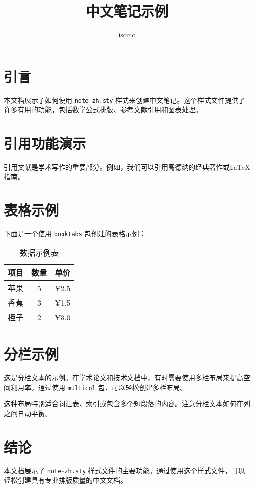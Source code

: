 \documentclass{article}
\title{中文笔记示例}
\author{isomo}
\begin{document}
\maketitle

\section{引言}
本文档展示了如何使用 \texttt{note-zh.sty} 样式来创建中文笔记。这个样式文件提供了许多有用的功能，包括数学公式排版、参考文献引用和图表处理。

\section{引用功能演示}
引用文献是学术写作的重要部分。例如，我们可以引用高德纳的经典著作\cite{knuth1984texbook}或LaTeX指南\cite{lamport1994latex}。

\section{表格示例}
下面是一个使用 \texttt{booktabs} 包创建的表格示例：

\begin{table}[htbp]
  \centering
  \caption{数据示例表}
  \begin{tabular}{lcc}
    \toprule
    项目 & 数量 & 单价 \\
    \midrule
    苹果 & 5 & ¥2.5 \\
    香蕉 & 3 & ¥1.5 \\
    橙子 & 2 & ¥3.0 \\
    \bottomrule
  \end{tabular}
\end{table}

\section{分栏示例}
\begin{multicols}{2}
  这是分栏文本的示例。在学术论文和技术文档中，有时需要使用多栏布局来提高空间利用率。通过使用 \texttt{multicol} 包，可以轻松创建多栏布局。

  这种布局特别适合词汇表、索引或包含多个短段落的内容。注意分栏文本如何在列之间自动平衡。
\end{multicols}

\section{结论}
本文档展示了 \texttt{note-zh.sty} 样式文件的主要功能。通过使用这个样式文件，可以轻松创建具有专业排版质量的中文文档。



\end{document}
